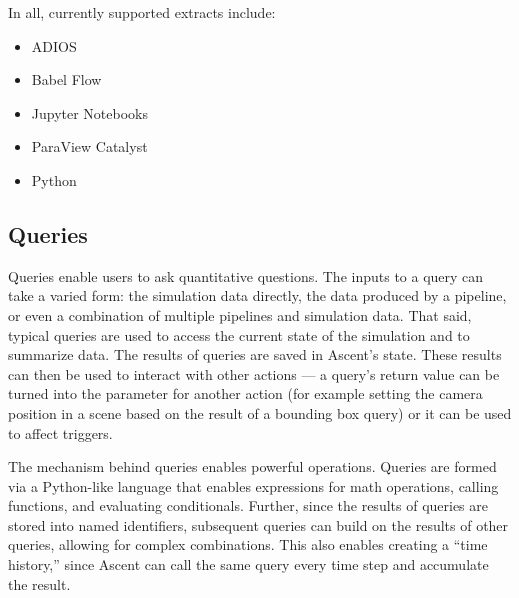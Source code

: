 In all, currently supported extracts include:
\begin{itemize}
\item ADIOS
\item Babel Flow~\cite{babelflow}
\item Jupyter Notebooks
\item ParaView Catalyst
\item Python
\end{itemize}

\subsection{Queries}
\label{action_queries}
Queries enable users to ask quantitative questions.
%
The inputs to a query can take a varied form:
the simulation data directly,
the data produced by a pipeline,
or even a combination of multiple pipelines and simulation data.
%
That said, typical queries are used to access the current state of the simulation
and to summarize data.
%
The results of queries are saved in Ascent's state.
%
These results can then be used to
interact with other actions --- a query's return value can be turned
into the parameter for another action (for example setting the camera position in a scene based
on the result of a bounding box query) or it can be used to affect triggers.
%

The mechanism behind queries enables powerful operations.
%
Queries are formed via a Python-like language that
enables expressions for math operations,
calling functions, and evaluating conditionals.
%
Further, since the results of queries are stored into named identifiers, subsequent queries
can build on the results of other queries, allowing for complex combinations.
%
%
This also enables creating a ``time history,'' since
Ascent can call the same query every time step and accumulate the result.


%
%

